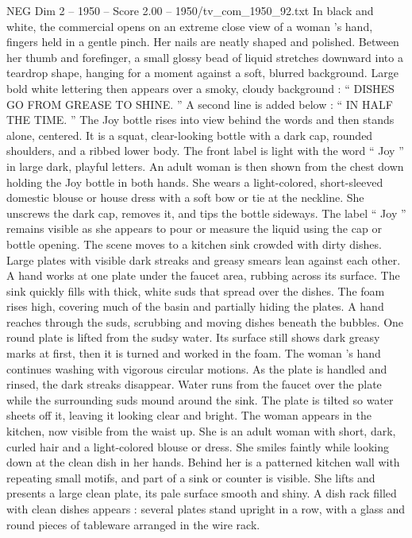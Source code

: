 \begin{textsample}{NEG Dim 2 – 1950 – Score 2.00 – 1950/tv\_com\_1950\_92.txt}  \label{ex:f2_neg_020}
In black and white, the commercial opens on an extreme close view of a woman ’s hand, fingers held in a gentle pinch.
Her nails are neatly shaped and polished.
Between her thumb and forefinger, a small glossy bead of liquid stretches downward into a teardrop shape, hanging for a moment against a soft, blurred background.
Large bold white lettering then appears over a smoky, cloudy background : “ DISHES GO FROM GREASE TO SHINE. ” A second line is added below : “ IN HALF THE TIME. ” The Joy bottle rises into view behind the words and then stands alone, centered.
It is a squat, clear-looking bottle with a dark cap, rounded shoulders, and a ribbed lower body.
The front label is light with the word “ Joy ” in large dark, playful letters.
An adult woman is then shown from the chest down holding the Joy bottle in both hands.
She wears a light-colored, short-sleeved domestic blouse or house dress with a soft bow or tie at the neckline.
She unscrews the dark cap, removes it, and tips the bottle sideways.
The label “ Joy ” remains visible as she appears to pour or measure the liquid using the cap or bottle opening.
The scene moves to a kitchen sink crowded with dirty dishes.
Large plates with visible dark streaks and greasy smears lean against each other.
A hand works at one plate under the faucet area, rubbing across its surface.
The sink quickly fills with thick, white suds that spread over the dishes.
The foam rises high, covering much of the basin and partially hiding the plates.
A hand reaches through the suds, scrubbing and moving dishes beneath the bubbles.
One round plate is lifted from the sudsy water.
Its surface still shows dark greasy marks at first, then it is turned and worked in the foam.
The woman ’s hand continues washing with vigorous circular motions.
As the plate is handled and rinsed, the dark streaks disappear.
Water runs from the faucet over the plate while the surrounding suds mound around the sink.
The plate is tilted so water sheets off it, leaving it looking clear and bright.
The woman appears in the kitchen, now visible from the waist up.
She is an adult woman with short, dark, curled hair and a light-colored blouse or dress.
She smiles faintly while looking down at the clean dish in her hands.
Behind her is a patterned kitchen wall with repeating small motifs, and part of a sink or counter is visible.
She lifts and presents a large clean plate, its pale surface smooth and shiny.
A dish rack filled with clean dishes appears : several plates stand upright in a row, with a glass and round pieces of tableware arranged in the wire rack.

\end{textsample}
